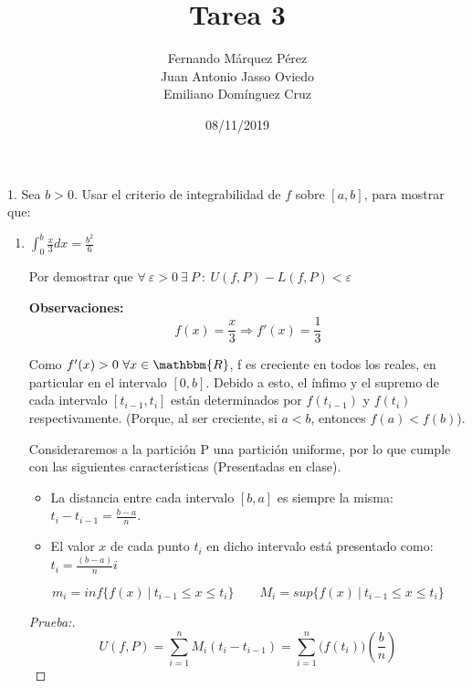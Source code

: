 \documentclass[12pt]{article}
\title{Tarea 3}
\author{Fernando Márquez Pérez \\ Juan Antonio Jasso Oviedo \\ Emiliano Dom\'inguez Cruz}
\date{08/11/2019}
\affil{Facultad de Ciencias\\UNAM}
\begin{document}
\begin{titlepage}
    \maketitle
\end{titlepage}

1. Sea $b>0$. Usar el criterio de integrabilidad de $f$ sobre $[a,b]$, para mostrar que:

\begin{enumerate}[\hspace{9px} a)]
    \item \(\displaystyle\int_{0}^{b}\frac{x}{3}dx=\frac{b^2}{6}\)\medskip
    
    Por demostrar que \(\forall \ \varepsilon>0 \ \exists \ P \ : \ U(f,P)-L(f,P)<\varepsilon\)\medskip

    \textbf{Observaciones:}
    \[f(x)=\frac{x}{3} \Rightarrow f'(x)=\frac{1}{3}\]

    Como \(f'(x)>0 \ \forall x \in \mathbbm{R}\), f es creciente en todos los reales, en particular en el intervalo $[0,b]$. Debido a esto, el \'infimo y el supremo de cada intervalo \([t_{i-1},t_i]\) est\'an determinados por \(f(t_{i-1})\) y \(f(t_i)\) respectivamente. (Porque, al ser creciente, si $a<b$, entonces \(f(a)<f(b)\)).\medskip

    Consideraremos a la partici\'on P una partici\'on uniforme, por lo que cumple con las siguientes caracter\'isticas (Presentadas en clase).
    \begin{itemize}
        \item La distancia entre cada intervalo $[b,a]$ es siempre la misma: \(t_i-t_{i-1}=\displaystyle\frac{b-a}{n}\).
        \item El valor $x$ de cada punto $t_i$ en dicho intervalo est\'a presentado como: \(t_i=\displaystyle\frac{(b-a)}{n}i\)
    \end{itemize}

    \[m_i=inf\{f(x) \ | \ t_{i-1} \leq x \leq t_i\} \qquad M_i=sup\{f(x) \ | \ t_{i-1} \leq x \leq t_i\}\]

    \begin{proof}[Prueba:]
        \begin{equation*}%
            U(f,P)=\sum_{i=1}^n M_i(t_i-t_{i-1}) = \sum_{i=1}^n \big(f(t_i)\big)\left(\displaystyle\frac{b}{n}\right)
        \end{equation*}


\end{proof}
\end{enumerate}
\end{document}
